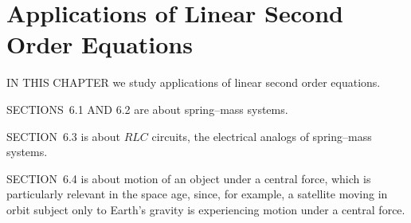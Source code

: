 \chapter{Applications of Linear Second Order Equations}

\noindent
IN THIS CHAPTER we study applications of linear second order equations.

\medskip
\noindent
SECTIONS~6.1 AND 6.2 are about spring--mass systems.

\medskip
\noindent
SECTION~6.3 is about $RLC$ circuits, the electrical analogs of spring--mass systems.

\medskip
\noindent
SECTION~6.4 is about motion of an object under a central force, which is particularly relevant in
the space age, since, for example, a satellite moving in orbit subject only to Earth's gravity is
experiencing motion under a central force.

\newpage








